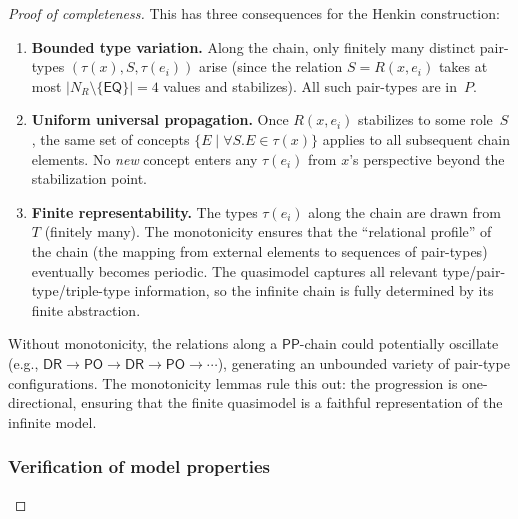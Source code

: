 \documentclass[a4paper,11pt]{article}
\theoremstyle{definition}
\newcommand{\NR}{\ensuremath{N_R}}
\newcommand{\DR}{\ensuremath{\mathsf{DR}}}
\newcommand{\PO}{\ensuremath{\mathsf{PO}}}
\newcommand{\EQ}{\ensuremath{\mathsf{EQ}}}
\newcommand{\PP}{\ensuremath{\mathsf{PP}}}
\begin{document}
\begin{proof}[Proof of completeness]
This has three consequences for the Henkin construction:

\begin{enumerate}[nosep]
  \item \textbf{Bounded type variation.}\; Along the chain, only
    finitely many distinct pair-types $(\tau(x), S, \tau(e_i))$ arise
    (since the relation $S = R(x, e_i)$ takes at most $|\NR
    \setminus \{\EQ\}| = 4$ values and stabilizes).  All such
    pair-types are in~$P$.

  \item \textbf{Uniform universal propagation.}\; Once $R(x, e_i)$
    stabilizes to some role~$S$, the same set of concepts $\{E \mid
    \forall S.E \in \tau(x)\}$ applies to all subsequent chain
    elements.  No \emph{new} concept enters any $\tau(e_i)$ from $x$'s
    perspective beyond the stabilization point.

  \item \textbf{Finite representability.}\; The types $\tau(e_i)$
    along the chain are drawn from~$T$ (finitely many).  The
    monotonicity ensures that the ``relational profile'' of the chain
    (the mapping from external elements to sequences of pair-types)
    eventually becomes periodic.  The quasimodel captures all relevant
    type/pair-type/triple-type information, so the infinite chain is
    fully determined by its finite abstraction.
\end{enumerate}

Without monotonicity, the relations along a $\PP$-chain could
potentially oscillate (e.g., $\DR \to \PO \to \DR \to \PO \to
\cdots$), generating an unbounded variety of pair-type configurations.
The monotonicity lemmas rule this out: the progression is
one-directional, ensuring that the finite quasimodel is a faithful
representation of the infinite model.

\subsubsection*{Verification of model properties}


\end{proof}
\end{document}
